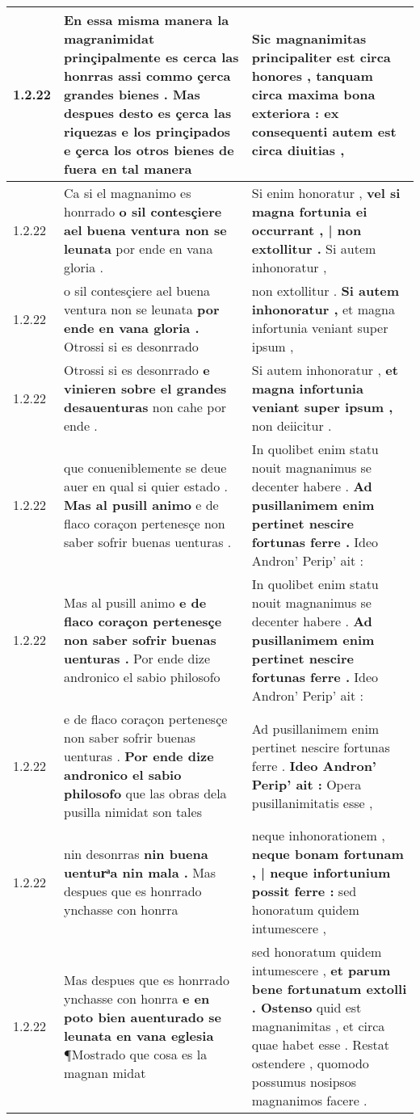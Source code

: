 \begin{tabular}{|p{1cm}|p{6.5cm}|p{6.5cm}|}
1.2.22 & En essa misma manera la magranimidat prinçipalmente es cerca las honrras \textbf{ assi commo çerca grandes bienes . } Mas despues desto es çerca las riquezas e los prinçipados e çerca los otros bienes de fuera en tal manera & Sic magnanimitas principaliter est circa honores , \textbf{ tanquam circa maxima bona exteriora : } ex consequenti autem est circa diuitias , \\\hline
1.2.22 & Ca si el magnanimo es honrrado \textbf{ o sil contesçiere ael buena ventura non se leunata } por ende en vana gloria . & Si enim honoratur , \textbf{ vel si magna fortunia ei occurrant , | non extollitur . } Si autem inhonoratur , \\\hline
1.2.22 & o sil contesçiere ael buena ventura non se leunata \textbf{ por ende en vana gloria . } Otrossi si es desonrrado & non extollitur . \textbf{ Si autem inhonoratur , } et magna infortunia veniant super ipsum , \\\hline
1.2.22 & Otrossi si es desonrrado \textbf{ e vinieren sobre el grandes desauenturas } non cahe por ende . & Si autem inhonoratur , \textbf{ et magna infortunia veniant super ipsum , } non deiicitur . \\\hline
1.2.22 & que conueniblemente se deue auer en qual si quier estado . \textbf{ Mas al pusill animo } e de flaco coraçon pertenesçe non saber sofrir buenas uenturas . & In quolibet enim statu nouit magnanimus se decenter habere . \textbf{ Ad pusillanimem enim pertinet nescire fortunas ferre . } Ideo Andron’ Perip’ ait : \\\hline
1.2.22 & Mas al pusill animo \textbf{ e de flaco coraçon pertenesçe non saber sofrir buenas uenturas . } Por ende dize andronico el sabio philosofo & In quolibet enim statu nouit magnanimus se decenter habere . \textbf{ Ad pusillanimem enim pertinet nescire fortunas ferre . } Ideo Andron’ Perip’ ait : \\\hline
1.2.22 & e de flaco coraçon pertenesçe non saber sofrir buenas uenturas . \textbf{ Por ende dize andronico el sabio philosofo } que las obras dela pusilla nimidat son tales & Ad pusillanimem enim pertinet nescire fortunas ferre . \textbf{ Ideo Andron’ Perip’ ait : } Opera pusillanimitatis esse , \\\hline
1.2.22 & nin desonrras \textbf{ nin buena uenturͣa nin mala . } Mas despues que es honrrado ynchasse con honrra & neque inhonorationem , \textbf{ neque bonam fortunam , | neque infortunium possit ferre : } sed honoratum quidem intumescere , \\\hline
1.2.22 & Mas despues que es honrrado ynchasse con honrra \textbf{ e en poto bien auenturado se leunata en vana eglesia } ¶Mostrado que cosa es la magnan midat & sed honoratum quidem intumescere , \textbf{ et parum bene fortunatum extolli . Ostenso } quid est magnanimitas , et circa quae habet esse . Restat ostendere , quomodo possumus nosipsos magnanimos facere . \\\hline

\end{tabular}
